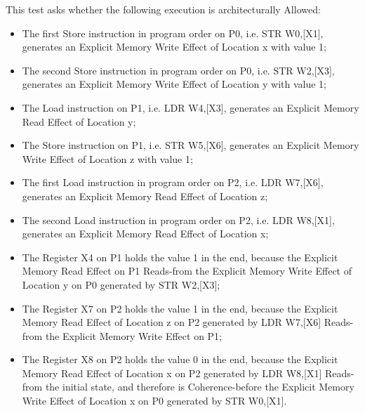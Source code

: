 This test asks whether the following execution is architecturally Allowed:

\begin{itemize}
  \item The first Store instruction in program order on P0, i.e. STR W0,[X1], generates an Explicit Memory Write Effect of Location x with value 1;
  \item The second Store instruction in program order on P0, i.e. STR W2,[X3], generates an Explicit Memory Write Effect of Location y with value 1;
  \item The Load instruction on P1, i.e. LDR W4,[X3], generates an Explicit Memory Read Effect of Location y;
  \item The Store instruction on P1, i.e. STR W5,[X6], generates an Explicit Memory Write Effect of Location z with value 1;
  \item The first Load instruction in program order on P2, i.e. LDR W7,[X6], generates an Explicit Memory Read Effect of Location z;
  \item The second Load instruction in program order on P2, i.e. LDR W8,[X1], generates an Explicit Memory Read Effect of Location x;
  \item The Register X4 on P1 holds the value 1 in the end, because the Explicit Memory Read Effect on P1 Reads-from the Explicit Memory Write Effect of Location y on P0 generated by STR W2,[X3];
  \item The Register X7 on P2 holds the value 1 in the end, because the Explicit Memory Read Effect of Location z on P2 generated by LDR W7,[X6] Reads-from the Explicit Memory Write Effect on P1;
  \item The Register X8 on P2 holds the value 0 in the end, because the Explicit Memory Read Effect of Location x on P2 generated by LDR W8,[X1] Reads-from the initial state, and therefore is Coherence-before the Explicit Memory Write Effect of Location x on P0 generated by STR W0,[X1].
\end{itemize}
